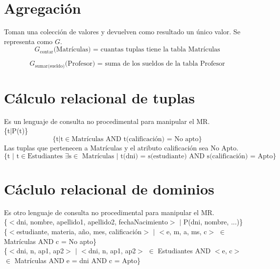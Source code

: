 \documentclass{article}
\begin{document}
\section{Agregación}
Toman una colección de valores y devuelven como resultado un único valor. Se representa como $G$. 
$$G_{\text{contar}}\text{(Matrículas) = cuantas tuplas tiene la tabla Matrículas}$$

$$G_{\text{sumar(sueldo)}}\text{(Profesor) = suma de los sueldos de la tabla Profesor}$$

\section{Cálculo relacional de tuplas}
Es un lenguaje de consulta no procedimental para manipular el MR. \\
\{t$|$P(t)\} \\

$$\text{\{t}|\text{t}\in \text{Matrículas AND t(calificación) = No apto\}}$$
Las tuplas que pertenecen a Matrículas y el atributo calificación sea No Apto. \\

$$\text{\{t }|\text{ t}\in \text{Estudiantes } \exists \text{s} \in \text{ Matrículas } | \text{ t(dni) = s(estudiante) AND s(calificación) = Apto\}}$$

\newpage

\section{Cáclulo relacional de dominios}
Es otro lenguaje de consulta no procedimental para manipular el MR. \\
\{$<$dni, nombre, apellido1, apellido2, fechaNacimiento$>$ $|$ P(dni, nombre, ...)\} \\

\{$<$estudiante, materia, año, mes, calificación$>$ $|$ $<$e, m, a, ms, c$>$ $\in$ Matrículas AND c = No apto\} \\

\{$<$dni, n, ap1, ap2$>$ $|$ $<$dni, n, ap1, ap2$>$ $\in$ Estudiantes AND $<$e, c$>$ $\in$ Matrículas AND e = dni AND c = Apto\}

\begin{comment}
\begin{figure}[h]
    \centering
    \texttt{[image: 1.png]}
    \caption{}
\end{figure}
\end{comment}

\begin{comment}
\begin{wrapfigure}[]{r}{0.5\linewidth}
    \centering
    \texttt{[image: 8.png]}
    \caption{}
\end{wrapfigure}
\end{comment}
\end{document}
